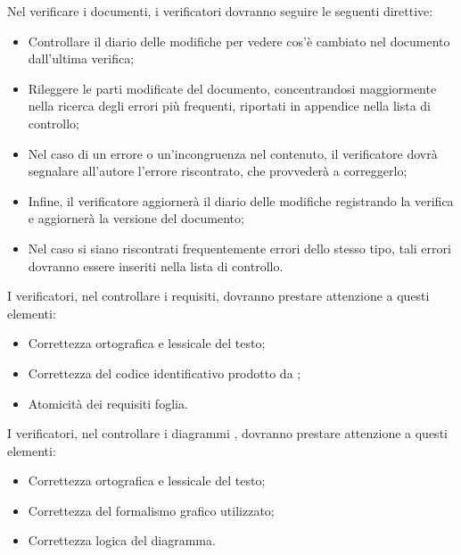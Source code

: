 Nel verificare i documenti, i verificatori dovranno seguire le seguenti direttive:
\begin{itemize}
\item Controllare il diario delle modifiche per vedere cos'è cambiato nel documento
dall'ultima verifica;
\item Rileggere le parti modificate del documento, concentrandosi maggiormente nella
ricerca degli errori più frequenti, riportati in appendice nella lista di controllo;
\item Nel caso di un errore o un'incongruenza nel contenuto, il verificatore dovrà segnalare all'autore l'errore riscontrato, che provvederà a correggerlo;
\item Infine, il verificatore aggiornerà il diario delle modifiche registrando la verifica e
aggiornerà la versione del documento;
\item Nel caso si siano riscontrati frequentemente errori dello stesso tipo, tali errori
dovranno essere inseriti nella lista di controllo.

\end{itemize}

I verificatori, nel controllare i requisiti, dovranno prestare attenzione a questi elementi:
\begin{itemize}
\item Correttezza ortografica e lessicale del testo;
\item Correttezza del codice identificativo prodotto da ;
\item Atomicità dei requisiti foglia.
\end{itemize}

I verificatori, nel controllare i diagrammi , dovranno prestare attenzione a
questi elementi:
\begin{itemize}
\item Correttezza ortografica e lessicale del testo;
\item Correttezza del formalismo grafico utilizzato;
\item Correttezza logica del diagramma.
\end{itemize}

